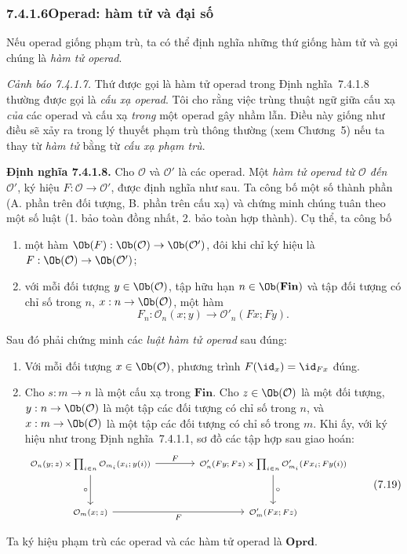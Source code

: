 \subsubsection*{7.4.1.6\quad Operad: hàm tử và đại số}
Nếu operad giống phạm trù, ta có thể định nghĩa những thứ giống hàm tử và gọi chúng là \emph{hàm tử operad}.

\noindent\textit{Cảnh báo 7.4.1.7.}\keepwithnext
Thứ được gọi là hàm tử operad trong Định nghĩa~7.4.1.8 thường được gọi là \emph{cấu xạ operad}. Tôi cho rằng việc trùng thuật ngữ giữa cấu xạ \emph{của} các operad và cấu xạ \emph{trong} một operad gây nhầm lẫn. Điều này giống như điều sẽ xảy ra trong lý thuyết phạm trù thông thường (xem Chương~5) nếu ta thay từ \emph{hàm tử} bằng từ \emph{cấu xạ phạm trù}.

\noindent\textbf{Định nghĩa 7.4.1.8.}\keepwithnext
Cho $\mathcal O$ và $\mathcal O'$ là các operad. Một \emph{hàm tử operad từ $\mathcal O$ đến $\mathcal O'$}, ký hiệu $F:\mathcal O\to\mathcal O'$, được định nghĩa như sau. Ta công bố một số thành phần (A. phần trên đối tượng, B. phần trên cấu xạ) và chứng minh chúng tuân theo một số luật (1. bảo toàn đồng nhất, 2. bảo toàn hợp thành). Cụ thể, ta công bố
\begin{enumerate}[label=\Alph*.]
\item một hàm $\Ob(F):\Ob(\mathcal O)\to\Ob(\mathcal O')$, đôi khi chỉ ký hiệu là $F:\Ob(\mathcal O)\to\Ob(\mathcal O')$;
\item với mỗi đối tượng $y\in\Ob(\mathcal O)$, tập hữu hạn $n\in\Ob(\mathbf{Fin})$ và tập đối tượng có chỉ số trong $n$, $x:n\to\Ob(\mathcal O)$, một hàm
\[
F_n:\mathcal O_n(x;y)\longrightarrow\mathcal O'_n(Fx;Fy).
\]
\end{enumerate}
Sau đó phải chứng minh các \emph{luật hàm tử operad} sau đúng:
\begin{enumerate}[label=\arabic*.]
\item Với mỗi đối tượng $x\in\Ob(\mathcal O)$, phương trình $F(\id_x)=\id_{Fx}$ đúng.
\item Cho $s:m\to n$ là một cấu xạ trong $\mathbf{Fin}$. Cho $z\in\Ob(\mathcal O)$ là một đối tượng, $y:n\to\Ob(\mathcal O)$ là một tập các đối tượng có chỉ số trong $n$, và $x:m\to\Ob(\mathcal O)$ là một tập các đối tượng có chỉ số trong $m$. Khi ấy, với ký hiệu như trong Định nghĩa~7.4.1.1, sơ đồ các tập hợp sau giao hoán:
\begin{equation}
\begin{tikzcd}[column sep=large,row sep=large,font=\scriptsize]
\mathcal O_n(y;z)\times\prod_{i\in n}\mathcal O_{m_i}(x_i;y(i))\arrow[r,"F"]\arrow[d,"\circ"']&\mathcal O'_n(Fy;Fz)\times\prod_{i\in n}\mathcal O'_{m_i}(Fx_i;Fy(i))\arrow[d,"\circ"]\\
\mathcal O_m(x;z)\arrow[r,"F"']&\mathcal O'_m(Fx;Fz)
\end{tikzcd}
\tag{7.19}
\end{equation}
\end{enumerate}
Ta ký hiệu phạm trù các operad và các hàm tử operad là $\mathbf{Oprd}$.

